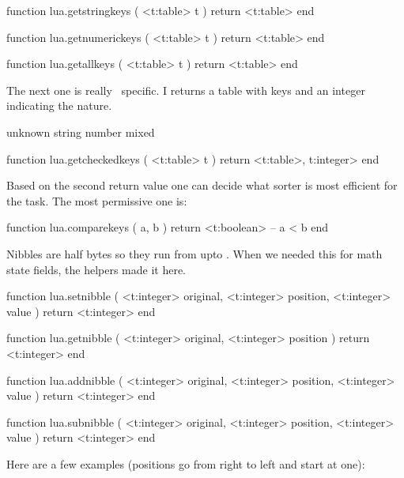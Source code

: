 \starttyping[option=LUA]
function lua.getstringkeys ( <t:table> t )
    return <t:table>
end

function lua.getnumerickeys ( <t:table> t )
    return <t:table>
end

function lua.getallkeys ( <t:table> t )
    return <t:table>
end
\stoptyping

The next one is really \CONTEXT\ specific. I returns a table with keys and
an integer indicating the nature.

\startcolumns[n=4]
\starttabulate[|T|l|]
 \NC unknown \NC \NR
{} \NC string  \NC \NR
{} \NC number  \NC \NR
{} \NC mixed   \NC \NR
\stoptabulate
\stopcolumns

\starttyping[option=LUA]
function lua.getcheckedkeys ( <t:table> t )
    return <t:table>, t:integer>
end
\stoptyping

Based on the second return value one can decide what sorter is most
efficient for the task. The most permissive one is:

\starttyping[option=LUA]
function lua.comparekeys ( a, b )
    return <t:boolean> -- a < b
end
\stoptyping

\stopsubsection

\startsubsection[title=Nibbles]

Nibbles are half bytes so they run from  upto . When we
needed this for math state fields, the helpers made it here.

\starttyping[option=LUA]
function lua.setnibble (
    <t:integer> original,
    <t:integer> position,
    <t:integer> value
)
    return <t:integer>
end
\stoptyping

\starttyping[option=LUA]
function lua.getnibble (
    <t:integer> original,
    <t:integer> position
)
    return <t:integer>
end
\stoptyping

\starttyping[option=LUA]
function lua.addnibble (
    <t:integer> original,
    <t:integer> position,
    <t:integer> value
)
    return <t:integer>
end
\stoptyping

\starttyping[option=LUA]
function lua.subnibble (
    <t:integer> original,
    <t:integer> position,
    <t:integer> value
)
    return <t:integer>
end
\stoptyping

Here are a few examples (positions go from right to left and start at one):

\protected{}

\starttabulate[|lT|r|]
\stoptabulate

